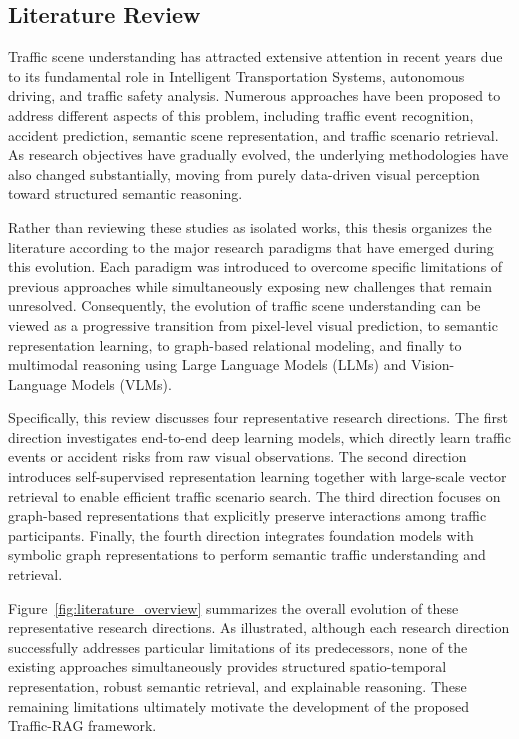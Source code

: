 \documentclass[a4paper, 11pt]{article} %
\begin{document}
\subsection{Literature Review}

Traffic scene understanding has attracted extensive attention in recent years due to its fundamental role in Intelligent Transportation Systems, autonomous driving, and traffic safety analysis. Numerous approaches have been proposed to address different aspects of this problem, including traffic event recognition, accident prediction, semantic scene representation, and traffic scenario retrieval. As research objectives have gradually evolved, the underlying methodologies have also changed substantially, moving from purely data-driven visual perception toward structured semantic reasoning.

Rather than reviewing these studies as isolated works, this thesis organizes the literature according to the major research paradigms that have emerged during this evolution. Each paradigm was introduced to overcome specific limitations of previous approaches while simultaneously exposing new challenges that remain unresolved. Consequently, the evolution of traffic scene understanding can be viewed as a progressive transition from pixel-level visual prediction, to semantic representation learning, to graph-based relational modeling, and finally to multimodal reasoning using Large Language Models (LLMs) and Vision-Language Models (VLMs).

Specifically, this review discusses four representative research directions. The first direction investigates end-to-end deep learning models, which directly learn traffic events or accident risks from raw visual observations. The second direction introduces self-supervised representation learning together with large-scale vector retrieval to enable efficient traffic scenario search. The third direction focuses on graph-based representations that explicitly preserve interactions among traffic participants. Finally, the fourth direction integrates foundation models with symbolic graph representations to perform semantic traffic understanding and retrieval.

Figure~\ref{fig:literature_overview} summarizes the overall evolution of these representative research directions. As illustrated, although each research direction successfully addresses particular limitations of its predecessors, none of the existing approaches simultaneously provides structured spatio-temporal representation, robust semantic retrieval, and explainable reasoning. These remaining limitations ultimately motivate the development of the proposed Traffic-RAG framework.
\end{document}
